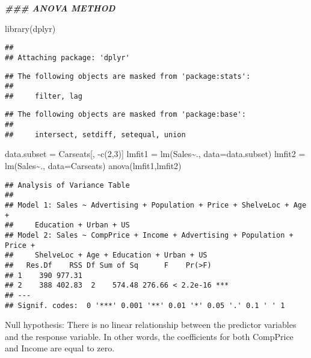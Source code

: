 \documentclass[
]{article}
\newenvironment{Shaded}{\begin{snugshade}}{\end{snugshade}}
\newcommand{\AttributeTok}[1]{\textcolor[rgb]{0.77,0.63,0.00}{#1}}
\newcommand{\DecValTok}[1]{\textcolor[rgb]{0.00,0.00,0.81}{#1}}
\newcommand{\DocumentationTok}[1]{\textcolor[rgb]{0.56,0.35,0.01}{\textbf{\textit{#1}}}}
\newcommand{\FunctionTok}[1]{\textcolor[rgb]{0.00,0.00,0.00}{#1}}
\newcommand{\NormalTok}[1]{#1}
\newcommand{\OtherTok}[1]{\textcolor[rgb]{0.56,0.35,0.01}{#1}}
\newcommand{\SpecialCharTok}[1]{\textcolor[rgb]{0.00,0.00,0.00}{#1}}
\begin{document}
\begin{Shaded}
\begin{Highlighting}[]
\DocumentationTok{\#\#\# ANOVA METHOD}

\FunctionTok{library}\NormalTok{(dplyr)}
\end{Highlighting}
\end{Shaded}

\begin{verbatim}
## 
## Attaching package: 'dplyr'
\end{verbatim}

\begin{verbatim}
## The following objects are masked from 'package:stats':
## 
##     filter, lag
\end{verbatim}

\begin{verbatim}
## The following objects are masked from 'package:base':
## 
##     intersect, setdiff, setequal, union
\end{verbatim}

\begin{Shaded}
\begin{Highlighting}[]
\NormalTok{data.subset }\OtherTok{=}\NormalTok{ Carseats[, }\SpecialCharTok{{-}}\FunctionTok{c}\NormalTok{(}\DecValTok{2}\NormalTok{,}\DecValTok{3}\NormalTok{)]}
\NormalTok{lmfit1 }\OtherTok{=} \FunctionTok{lm}\NormalTok{(Sales}\SpecialCharTok{\textasciitilde{}}\NormalTok{., }\AttributeTok{data=}\NormalTok{data.subset)}
\NormalTok{lmfit2 }\OtherTok{=} \FunctionTok{lm}\NormalTok{(Sales}\SpecialCharTok{\textasciitilde{}}\NormalTok{., }\AttributeTok{data=}\NormalTok{Carseats)}
\FunctionTok{anova}\NormalTok{(lmfit1,lmfit2)}
\end{Highlighting}
\end{Shaded}

\begin{verbatim}
## Analysis of Variance Table
## 
## Model 1: Sales ~ Advertising + Population + Price + ShelveLoc + Age + 
##     Education + Urban + US
## Model 2: Sales ~ CompPrice + Income + Advertising + Population + Price + 
##     ShelveLoc + Age + Education + Urban + US
##   Res.Df    RSS Df Sum of Sq      F    Pr(>F)    
## 1    390 977.31                                  
## 2    388 402.83  2    574.48 276.66 < 2.2e-16 ***
## ---
## Signif. codes:  0 '***' 0.001 '**' 0.01 '*' 0.05 '.' 0.1 ' ' 1
\end{verbatim}

Null hypothesis: There is no linear relationship between the predictor
variables and the response variable. In other words, the coefficients
for both CompPrice and Income are equal to zero.
\end{document}
